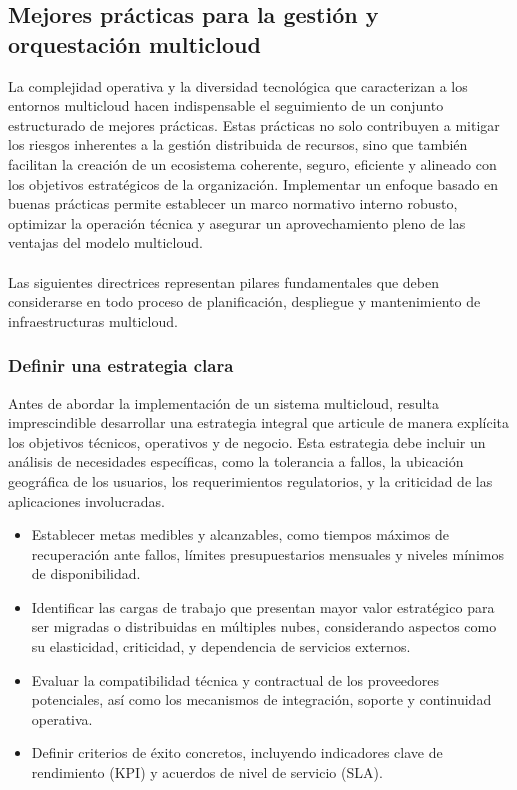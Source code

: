 {        \subsection{Mejores prácticas para la gestión y orquestación multicloud}
            La complejidad operativa y la diversidad tecnológica que caracterizan a los entornos multicloud hacen indispensable el seguimiento de un conjunto estructurado de mejores prácticas. Estas prácticas no solo contribuyen a mitigar los riesgos inherentes a la gestión distribuida de recursos, sino que también facilitan la creación de un ecosistema coherente, seguro, eficiente y alineado con los objetivos estratégicos de la organización. Implementar un enfoque basado en buenas prácticas permite establecer un marco normativo interno robusto, optimizar la operación técnica y asegurar un aprovechamiento pleno de las ventajas del modelo multicloud.
                
            \paragraph{}Las siguientes directrices representan pilares fundamentales que deben considerarse en todo proceso de planificación, despliegue y mantenimiento de infraestructuras multicloud.
                
            \subsubsection{Definir una estrategia clara}
                Antes de abordar la implementación de un sistema multicloud, resulta imprescindible desarrollar una estrategia integral que articule de manera explícita los objetivos técnicos, operativos y de negocio. Esta estrategia debe incluir un análisis de necesidades específicas, como la tolerancia a fallos, la ubicación geográfica de los usuarios, los requerimientos regulatorios, y la criticidad de las aplicaciones involucradas.
                
                \begin{itemize}
                    \item Establecer metas medibles y alcanzables, como tiempos máximos de recuperación ante fallos, límites presupuestarios mensuales y niveles mínimos de disponibilidad.
                    \item Identificar las cargas de trabajo que presentan mayor valor estratégico para ser migradas o distribuidas en múltiples nubes, considerando aspectos como su elasticidad, criticidad, y dependencia de servicios externos.
                    \item Evaluar la compatibilidad técnica y contractual de los proveedores potenciales, así como los mecanismos de integración, soporte y continuidad operativa.
                    \item Definir criterios de éxito concretos, incluyendo indicadores clave de rendimiento (KPI) y acuerdos de nivel de servicio (SLA).
                \end{itemize}
                
}
